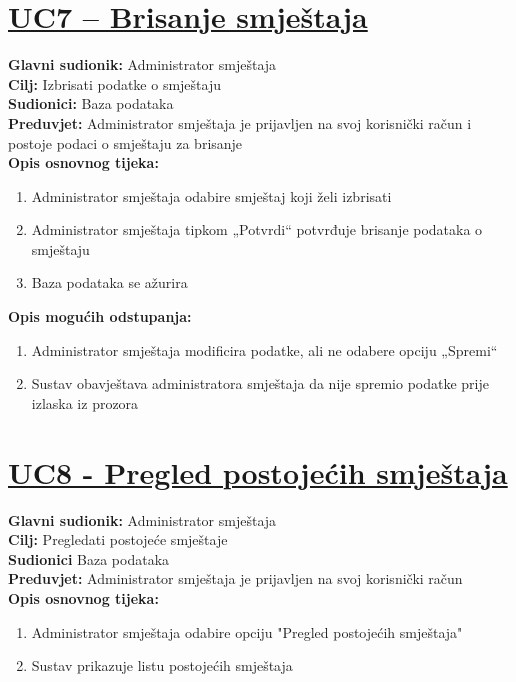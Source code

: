 \documentclass{article}
\begin{document}
	\section*{\underline{UC7 – Brisanje smještaja}}
	\textbf{Glavni sudionik:} Administrator smještaja \\
	\textbf{Cilj:} Izbrisati podatke o smještaju \\
	\textbf{Sudionici:} Baza podataka \\
	\textbf{Preduvjet:} Administrator smještaja je prijavljen na svoj korisnički račun i postoje podaci o smještaju za brisanje \\
	\textbf{Opis osnovnog tijeka:}
	\begin{enumerate}
		\item Administrator smještaja odabire smještaj koji želi izbrisati
		\item Administrator smještaja tipkom „Potvrdi“ potvrđuje brisanje podataka o smještaju
		\item Baza podataka se ažurira
	\end{enumerate}
	\textbf{Opis mogućih odstupanja:}
	\begin{enumerate}
		\item Administrator smještaja modificira podatke, ali ne odabere opciju „Spremi“
		\item Sustav obavještava administratora smještaja da nije spremio podatke prije izlaska iz prozora
	\end{enumerate}
	
	\section* {\underline{UC8 - Pregled postojećih smještaja}}
	\textbf{Glavni sudionik:} Administrator smještaja \\
	\textbf{Cilj:} Pregledati postojeće smještaje \\
	\textbf{Sudionici} Baza podataka \\
	\textbf{Preduvjet:} Administrator smještaja je prijavljen na svoj korisnički račun \\
	\textbf{Opis osnovnog tijeka:}
	\begin{enumerate}
		\item Administrator smještaja odabire opciju "Pregled postojećih smještaja"
		\item Sustav prikazuje listu postojećih smještaja
	\end{enumerate}
	
\end{document}
